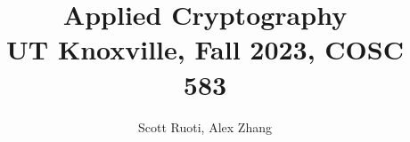 \documentclass[math,code]{amznotes}
\title{\textbf{Applied Cryptography}\\
\large UT Knoxville, Fall 2023, COSC 583}
\author{Scott Ruoti, Alex Zhang}
\begin{document}
\maketitle
\tableofcontents






\amzindex
\end{document}
